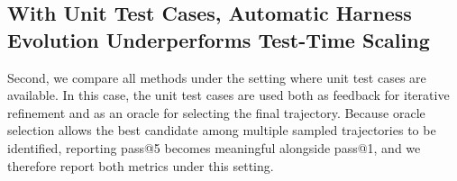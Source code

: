 \documentclass{article}
\begin{document}
\subsection{With Unit Test Cases, Automatic Harness Evolution Underperforms Test-Time Scaling}
\label{sec:experiment_with_test_feedback}

\begin{table}[h]
\centering
{}
\caption{Experimental results on Terminal-Bench 2.1 when unit test cases are available. Best results in \textbf{bold} and second best in \underline{underline}. Automatic harness evolution algorithms still underperform test-time scaling baselines in this setting, on both pass@1 and pass@5.}
\label{tab:exp2}
\end{table}

Second, we compare all methods under the setting where unit test cases are available. In this case, the unit test cases are used both as feedback for iterative refinement and as an oracle for selecting the final trajectory. Because oracle selection allows the best candidate among multiple sampled trajectories to be identified, reporting pass@5 becomes meaningful alongside pass@1, and we therefore report both metrics under this setting.
\end{document}
